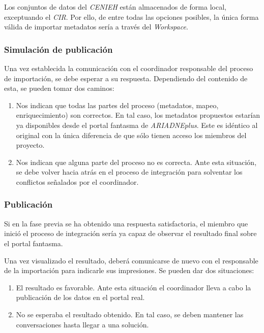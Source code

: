 Los conjuntos de datos del \emph{CENIEH} están almacenados de forma local,
exceptuando el \emph{CIR}. Por ello, de entre todas las opciones posibles, la
única forma válida de importar metadatos sería a través del
\emph{Workspace}.

\subsubsection{Simulación de publicación}

Una vez establecida la comunicación con el coordinador responsable del
proceso de importación, se debe esperar a su respuesta. Dependiendo del
contenido de esta, se pueden tomar dos caminos:

\begin{enumerate}
\def\labelenumi{\arabic{enumi}.}
\tightlist
\item
  Nos indican que todas las partes del proceso (metadatos, mapeo,
  enriquecimiento) son correctos. En tal caso, los metadatos propuestos
  estarían ya disponibles desde el portal fantasma de \emph{ARIADNEplus}. Este
  es idéntico al original con la única diferencia de que sólo tienen
  acceso los miembros del proyecto.
\item
  Nos indican que alguna parte del proceso no es correcta. Ante esta
  situación, se debe volver hacia atrás en el proceso de integración
  para solventar los conflictos señalados por el coordinador.
\end{enumerate}

\subsubsection{Publicación}

Si en la fase previa se ha obtenido una respuesta satisfactoria, el
miembro que inició el proceso de integración sería ya capaz de observar
el resultado final sobre el portal fantasma. 

Una vez visualizado el resultado, deberá comunicarse de nuevo con el
responsable de la importación para indicarle sus impresiones. Se pueden
dar dos situaciones:

\begin{enumerate}
\def\labelenumi{\arabic{enumi}.}
\tightlist
\item
  El resultado es favorable. Ante esta situación el coordinador lleva a
  cabo la publicación de los datos en el portal real.
\item
  No se esperaba el resultado obtenido. En tal caso, se deben mantener
  las conversaciones hasta llegar a una solución.
\end{enumerate}

